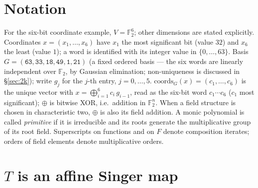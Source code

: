 \documentclass[11pt]{article}
\begin{document}
\section{Notation}\label{sec:not}
For the six-bit coordinate example, $V=\mathbb{F}_2^6$; other dimensions
are stated explicitly. Coordinates $x=(x_1,\dots,x_6)$ have $x_1$ the most significant
bit (value $32$) and $x_6$ the least (value $1$); a word is identified with its
integer value in $\{0,\dots,63\}$. Basis $G=(\texttt{63},\texttt{33},\texttt{18},
\texttt{49},\texttt{1},\texttt{21})$ (a fixed ordered basis --- the six words are linearly independent over $\mathbb{F}_2$, by Gaussian elimination; non-uniqueness is discussed in \S\ref{sec:2k}); write $g_j$ for
the $j$-th entry, $j=0,\dots,5$.
$\mathrm{coords}_G(x)=(c_1,\dots,c_6)$ is the unique vector with
$x=\bigoplus_{i=1}^6 c_i\,g_{i-1}$, read as the six-bit word $c_1\cdots c_6$
($c_1$ most significant); $\oplus$ is bitwise XOR, i.e.~addition in $\mathbb{F}_2^n$.
When a field structure is chosen in characteristic two, $\oplus$ is also its
field addition. A monic polynomial is called \emph{primitive} if it is
irreducible and its roots generate the multiplicative group of its root field.
Superscripts on functions and on $F$ denote composition iterates; orders of
field elements denote multiplicative orders.

\section[Affine Singer map]{$T$ is an affine Singer map}\label{sec:T}
\end{document}
